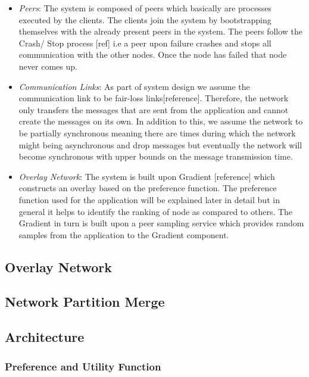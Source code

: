 \documentclass[a4paper, 11pt]{article}
\begin{document}
\begin{itemize}

\item \textit{Peers}: The system is composed of peers which basically are processes executed by the clients. The clients join the system by bootstrapping themselves with the already present peers in the system. The peers follow the Crash/ Stop process [ref] i.e a peer upon failure crashes and stops all communication with the other nodes. Once the node has failed that node never comes up. 


\item \textit{Communication Links}: As part of system design we assume the communication link to be fair-loss links[reference]. Therefore, the network only transfers the messages that are sent from the application and cannot create the messages on its own. In addition to this, we assume the network to be partially synchronous meaning there are times during which the network might being asynchronous and drop messages but eventually the network will become synchronous with upper bounds on the message transmission time.

\item \textit{Overlay Network}: The system is built upon Gradient [reference] which constructs an overlay based on the preference function. The preference function used for the application will be explained later in detail but in general it helps to identify the ranking of node as compared to others. The Gradient in turn is built upon a peer sampling service which provides random samples from the application to the Gradient component.

\end{itemize}



\subsection{Overlay Network}


\subsection{Network Partition Merge}

\subsection{Architecture}

\subsubsection*{Preference and Utility Function}
\end{document}
